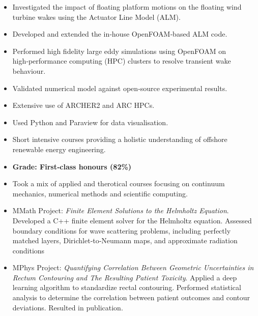 \documentclass{cv}
\begin{document}
\makecvtwocolheader
\vspace{5pt}
\noindent
\begin{minipage}[t]{0.65\textwidth}
\vspace{0pt}
\begin{itemize}
	\item Investigated the impact of floating platform motions on the floating wind turbine wakes using the Actuator Line Model (ALM).
	\item Developed and extended the in‑house OpenFOAM‑based ALM code.
	\item Performed high fidelity large eddy simulations using OpenFOAM on high‑performance computing (HPC) clusters to resolve transient wake behaviour.
	\item Validated numerical model against open‑source experimental results.
	\item Extensive use of ARCHER2 and ARC HPCs.
	\item Used Python and Paraview for data visualisation.
\end{itemize}
\cvitemskip

\begin{itemize}
	\item Short intensive courses providing a holistic understanding of offshore renewable energy engineering.
\end{itemize}
\cvitemskip

\begin{itemize}
	\item[] \textbf{Grade: First‑class honours (82\%)}
	\item Took a mix of applied and therotical courses focusing on continuum mechanics, numerical methods and scientific computing.
	\item MMath Project: \textit{Finite Element Solutions to the Helmholtz Equation}. Developed a C++ finite element solver for the Helmholtz equation. Assessed boundary conditions for wave scattering problems, including perfectly matched layers, Dirichlet‑to‑Neumann maps, and approximate radiation conditions
	\item MPhys Project: \textit{Quantifying Correlation Between Geometric Uncertainties in Rectum Contouring and The Resulting Patient Toxicity}. Applied a deep learning algorithm to standardize rectal contouring. Performed statistical analysis to determine the correlation between patient outcomes and contour deviations. Resulted in publication.
\end{itemize}



\end{minipage}
\end{document}
